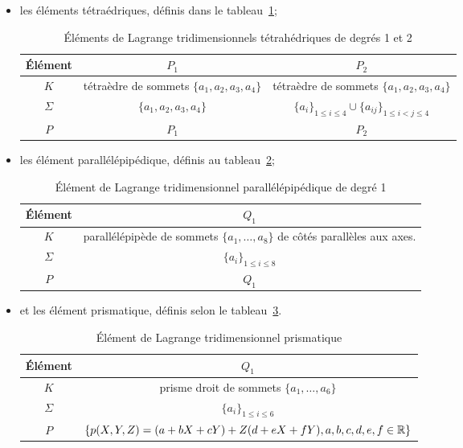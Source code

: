 \begin{itemize}
   \item les éléments tétraédriques, définis dans le tableau~\ref{tab:Elem:tri};
\begin{table}[ht]\centering\small
\begin{tabular}{c|cc}
Élément & $P_1$ & $P_2$ \\
\hline
$K$	      & tétraèdre de sommets $\{a_1, a_2, a_3, a_4\}$ & tétraèdre de sommets $\{a_1, a_2, a_3, a_4\}$\\
$\Sigma$   & $\{a_1, a_2, a_3, a_4\}$ & $\{a_i\}_{1\le i\le4}\cup\{a_{ij}\}_{1\le i<j\le 4}$ \\
$P$            & $P_1$ & $P_2$ \\
\hline
\end{tabular}
\caption{Éléments de Lagrange tridimensionnels tétrahédriques de degrés 1 et 2}\label{tab:Elem:tri}
\end{table}

\item les élément parallélépipédique, définis au tableau~\ref{tab:Elem:para};
\begin{table}[ht]\centering\small
\begin{tabular}{c|c}
Élément & $Q_1$\\
\hline
$K$ & parallélépipède de sommets $\{a_1,\ldots, a_8\}$ de côtés parallèles aux axes.\\
$\Sigma$ & $\{a_i\}_{1\le i\le8}$\\
$P$ & $Q_1$\\
\hline
\end{tabular}
\caption{Élément de Lagrange tridimensionnel parallélépipédique de degré 1}\label{tab:Elem:para}
\end{table}

\item et les élément prismatique, définis selon le tableau~\ref{tab:Elem:pri}.
\begin{table}[ht]\centering\small
\begin{tabular}{c|c}
Élément & $Q_1$\\
\hline
$K$ & prisme droit de sommets $\{a_1,\ldots, a_6\}$\\
$\Sigma$ & $\{a_i\}_{1\le i\le6}$\\
$P$ & $\{p(X,Y,Z) = (a + bX + cY ) + Z(d + eX + fY ), a,b,c,d,e,f\in\mathbb R\}$\\
\hline
\end{tabular}
\caption{Élément de Lagrange tridimensionnel prismatique}\label{tab:Elem:pri}
\end{table}
\end{itemize}


